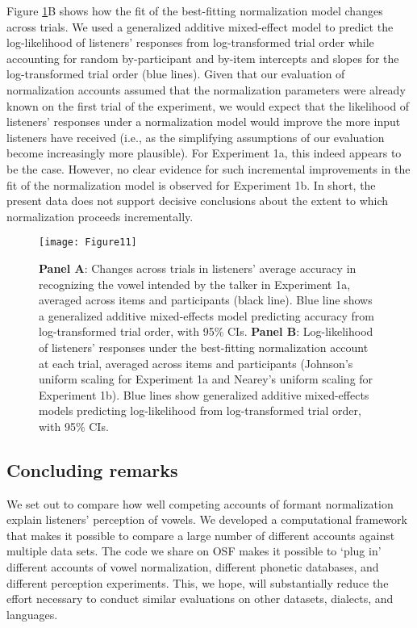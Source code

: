\documentclass[preprint]{JASA}
\begin{document}
Figure \ref{fig:Figure11}B shows how the fit of the best-fitting normalization model changes across trials. We used a generalized additive mixed-effect model to predict the log-likelihood of listeners' responses from log-transformed trial order while accounting for random by-participant and by-item intercepts and slopes for the log-transformed trial order (blue lines). Given that our evaluation of normalization accounts assumed that the normalization parameters were already known on the first trial of the experiment, we would expect that the likelihood of listeners' responses under a normalization model would improve the more input listeners have received (i.e., as the simplifying assumptions of our evaluation become increasingly more plausible). For Experiment 1a, this indeed appears to be the case. However, no clear evidence for such incremental improvements in the fit of the normalization model is observed for Experiment 1b. In short, the present data does not support decisive conclusions about the extent to which normalization proceeds incrementally.



\begin{figure}[!ht]

{\centering \texttt{[image: Figure11]} 

}

\caption{\textbf{Panel A}: Changes across trials in listeners' average accuracy in recognizing the vowel intended by the talker in Experiment 1a, averaged across items and participants (black line). Blue line shows a generalized additive mixed-effects model predicting accuracy from log-transformed trial order, with 95\% CIs. \textbf{Panel B}: Log-likelihood of listeners' responses under the best-fitting normalization account at each trial, averaged across items and participants (Johnson's uniform scaling for Experiment 1a and Nearey's uniform scaling for Experiment 1b). Blue lines show generalized additive mixed-effects models predicting log-likelihood from log-transformed trial order, with 95\% CIs.}\label{fig:Figure11}
\end{figure}

\subsection{Concluding remarks}\label{concluding-remarks}

We set out to compare how well competing accounts of formant normalization explain listeners' perception of vowels. We developed a computational framework that makes it possible to compare a large number of different accounts against multiple data sets. The code we share on OSF makes it possible to `plug in' different accounts of vowel normalization, different phonetic databases, and different perception experiments. This, we hope, will substantially reduce the effort necessary to conduct similar evaluations on other datasets, dialects, and languages.
\end{document}
